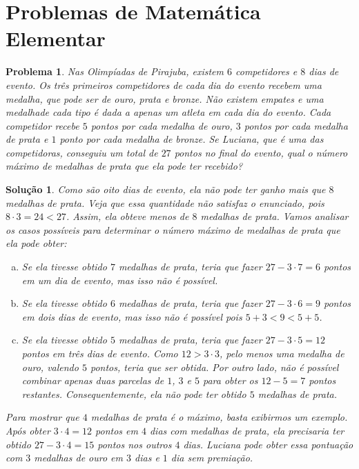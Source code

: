 \documentclass{hipatia}
\newtheorem{problem*}{Problema}
\newtheorem*{solution*}{Solução}
\begin{document}
\section{Problemas de Matemática Elementar}

\begin{problem*}
Nas Olimpíadas de Pirajuba, existem $6$ competidores e $8$ dias de evento. Os três primeiros competidores de cada dia do evento recebem uma medalha, que pode ser de ouro, prata e bronze. Não existem empates e uma medalhade cada tipo é dada a apenas um atleta em cada dia do evento. Cada competidor recebe $5$ pontos por cada medalha de ouro, $3$ pontos por cada medalha de prata e $1$ ponto por cada medalha de bronze. Se Luciana, que é uma das competidoras, conseguiu um total de $27$ pontos no final do evento, qual o número máximo de medalhas de prata que ela pode ter recebido?
\end{problem*}

\begin{solution*}
Como são oito dias de evento, ela não pode ter ganho mais que $8$ medalhas de prata. Veja que essa quantidade não satisfaz o enunciado, pois $8 \cdot 3 = 24 < 27$. Assim, ela obteve menos de $8$ medalhas de prata. Vamos analisar os casos possíveis para determinar o número máximo de medalhas de prata que ela pode obter:
\begin{enumerate}[a)]
\item  Se ela tivesse obtido $7$ medalhas de prata, teria que fazer $27-3 \cdot 7 = 6$ pontos em um dia de evento, mas isso não é possível. 

\item Se ela tivesse obtido $6$ medalhas de prata, teria que fazer $27 - 3 \cdot 6 = 9$ pontos em dois dias de evento, mas isso não é possível pois $5+3<9<5+5$.

\item Se ela tivesse obtido $5$ medalhas de prata, teria que fazer $27 - 3 \cdot 5 = 12$ pontos em três dias de evento. Como $12> 3 \cdot 3$, pelo menos uma medalha de ouro, valendo $5$ pontos, teria que ser obtida. Por outro lado, não é possível combinar apenas duas parcelas de $1$, $3$ e $5$ para obter os $12-5 = 7$ pontos restantes. Consequentemente, ela não pode ter obtido $5$ medalhas de prata.
\end{enumerate}

\noindent Para mostrar que $4$ medalhas de prata é o máximo, basta exibirmos um exemplo. Após obter $3 \cdot 4 = 12$ pontos em $4$ dias com medalhas de prata, ela precisaria ter obtido  $27 - 3 \cdot 4 = 15$ pontos nos outros $4$ dias. Luciana pode obter essa pontuação com $3$ medalhas de ouro em $3$ dias e $1$ dia sem premiação.

\end{solution*}
\end{document}
